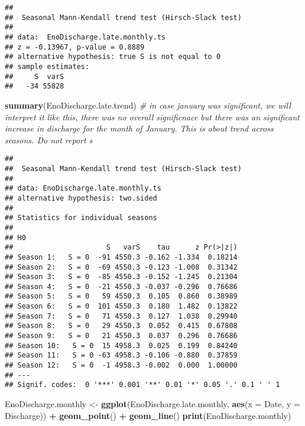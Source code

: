 \documentclass[
]{article}
\newenvironment{Shaded}{\begin{snugshade}}{\end{snugshade}}
\newcommand{\CommentTok}[1]{\textcolor[rgb]{0.56,0.35,0.01}{\textit{#1}}}
\newcommand{\DataTypeTok}[1]{\textcolor[rgb]{0.13,0.29,0.53}{#1}}
\newcommand{\KeywordTok}[1]{\textcolor[rgb]{0.13,0.29,0.53}{\textbf{#1}}}
\newcommand{\NormalTok}[1]{#1}
\newcommand{\OperatorTok}[1]{\textcolor[rgb]{0.81,0.36,0.00}{\textbf{#1}}}
\newcommand{\StringTok}[1]{\textcolor[rgb]{0.31,0.60,0.02}{#1}}
\begin{document}
\begin{verbatim}
## 
##  Seasonal Mann-Kendall trend test (Hirsch-Slack test)
## 
## data:  EnoDischarge.late.monthly.ts
## z = -0.13967, p-value = 0.8889
## alternative hypothesis: true S is not equal to 0
## sample estimates:
##     S  varS 
##   -34 55828
\end{verbatim}

\begin{Shaded}
\begin{Highlighting}[]
\KeywordTok{summary}\NormalTok{(EnoDischarge.late.trend) }\CommentTok{\# in case january was significant, we will interpret it like this, there was no overall significnace but there was an significant increase in discharge for the month of January. This is about trend across seasons. Do not report \textquotesingle{}s\textquotesingle{}}
\end{Highlighting}
\end{Shaded}

\begin{verbatim}
## 
##  Seasonal Mann-Kendall trend test (Hirsch-Slack test)
## 
## data: EnoDischarge.late.monthly.ts
## alternative hypothesis: two.sided
## 
## Statistics for individual seasons
## 
## H0
##                      S   varS    tau      z Pr(>|z|)  
## Season 1:   S = 0  -91 4550.3 -0.162 -1.334  0.18214  
## Season 2:   S = 0  -69 4550.3 -0.123 -1.008  0.31342  
## Season 3:   S = 0  -85 4550.3 -0.152 -1.245  0.21304  
## Season 4:   S = 0  -21 4550.3 -0.037 -0.296  0.76686  
## Season 5:   S = 0   59 4550.3  0.105  0.860  0.38989  
## Season 6:   S = 0  101 4550.3  0.180  1.482  0.13822  
## Season 7:   S = 0   71 4550.3  0.127  1.038  0.29940  
## Season 8:   S = 0   29 4550.3  0.052  0.415  0.67808  
## Season 9:   S = 0   21 4550.3  0.037  0.296  0.76686  
## Season 10:   S = 0  15 4958.3  0.025  0.199  0.84240  
## Season 11:   S = 0 -63 4958.3 -0.106 -0.880  0.37859  
## Season 12:   S = 0  -1 4958.3 -0.002  0.000  1.00000  
## ---
## Signif. codes:  0 '***' 0.001 '**' 0.01 '*' 0.05 '.' 0.1 ' ' 1
\end{verbatim}

\begin{Shaded}
\begin{Highlighting}[]
\NormalTok{EnoDischarge.monthly <{-}}
\KeywordTok{ggplot}\NormalTok{(EnoDischarge.late.monthly, }\KeywordTok{aes}\NormalTok{(}\DataTypeTok{x =}\NormalTok{ Date, }\DataTypeTok{y =}\NormalTok{ Discharge)) }\OperatorTok{+}
\StringTok{  }\KeywordTok{geom\_point}\NormalTok{() }\OperatorTok{+}
\StringTok{  }\KeywordTok{geom\_line}\NormalTok{()}
\KeywordTok{print}\NormalTok{(EnoDischarge.monthly)}
\end{Highlighting}
\end{Shaded}
\end{document}
